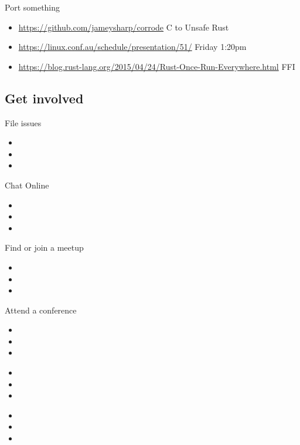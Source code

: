 \documentclass[xcolor={svgnames},hyperref]{beamer}
\begin{document}
    \begin{frame}
        Port something
        \begin{itemize}
            \item \url{https://github.com/jameysharp/corrode} C to Unsafe Rust
            \item \url{https://linux.conf.au/schedule/presentation/51/} Friday 1:20pm
            \item \url{https://blog.rust-lang.org/2015/04/24/Rust-Once-Run-Everywhere.html} FFI
        \end{itemize}
    \end{frame}


\subsection{Get involved}

    \begin{frame}
        File issues
        \begin{itemize}
            \item
            \item
            \item
        \end{itemize}
    \end{frame}

    \begin{frame}
        Chat Online
        \begin{itemize}
            \item
            \item
            \item
        \end{itemize}
    \end{frame}

    \begin{frame}
        Find or join a meetup
        \begin{itemize}
            \item
            \item
            \item
        \end{itemize}
    \end{frame}

    \begin{frame}
        Attend a conference
        \begin{itemize}
            \item
            \item
            \item
        \end{itemize}
    \end{frame}

    \begin{frame}
        \begin{itemize}
            \item
            \item
            \item
        \end{itemize}
    \end{frame}

    \begin{frame}
        \begin{itemize}
            \item
            \item
            \item
        \end{itemize}
    \end{frame}
\end{document}
